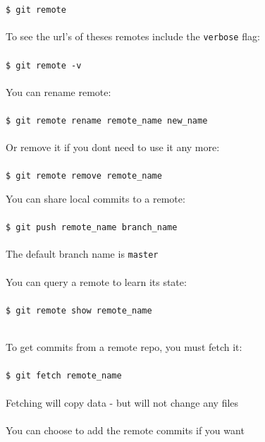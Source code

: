 \documentclass{beamer}
\begin{document}
\begin{frame}[allowframebreaks]{\secname}
    {\tt \$ git remote} \\~\\

    To see the url's of theses remotes include the {\tt verbose} flag: \\~\\

    {\tt \$ git remote -v} \\~\\

    You can rename remote:\\~\\
    {\tt \$ git remote rename remote\_name new\_name} \\~\\

    Or remove it if you dont need to use it any more: \\~\\

    {\tt \$ git remote remove remote\_name}

\framebreak

    You can share local commits to a remote: \\~\\

    {\tt \$ git push remote\_name branch\_name} \\~\\

    The default branch name is {\tt master} \\~\\

    You can query a remote to learn its state: \\~\\

    {\tt \$ git remote show remote\_name} \\~\\

\framebreak

    To get commits from a remote repo, you must fetch it:\\~\\

    {\tt \$ git fetch remote\_name} \\~\\

    Fetching will copy data - but will not change any files\\~\\
    
    You can choose to add the remote commits if you want
\end{frame}
\end{document}
